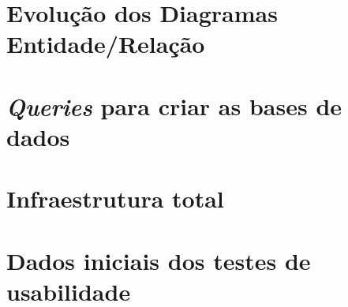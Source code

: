 \documentclass[11pt,twoside,a4paper]{report}
\begin{document}
%
%
\cleardoublepage



%  
%
%

\cleardoublepage
\appendix
\chapter{Evolução dos Diagramas Entidade/Relação}

\chapter{\textit{Queries} para criar as bases de dados}

\chapter{Infraestrutura total}

\chapter{Dados iniciais dos testes de usabilidade}
\label{apen:usabilidade}
\end{document}
